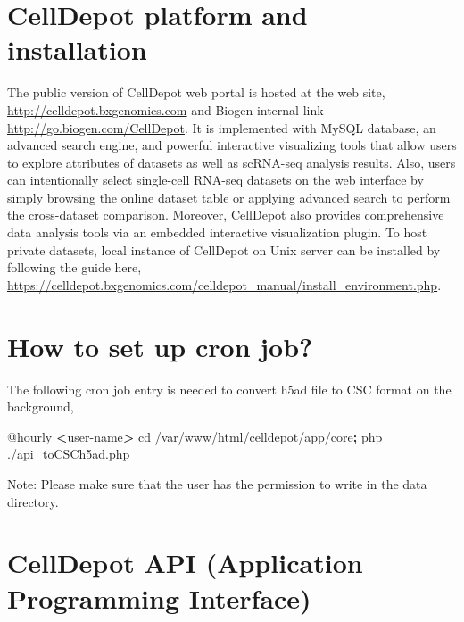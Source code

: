 \documentclass[
  openany]{book}
\newenvironment{Shaded}{\begin{snugshade}}{\end{snugshade}}
\newcommand{\ExtensionTok}[1]{#1}
\newcommand{\KeywordTok}[1]{\textcolor[rgb]{0.13,0.29,0.53}{\textbf{#1}}}
\newcommand{\NormalTok}[1]{#1}
\newcommand{\OperatorTok}[1]{\textcolor[rgb]{0.81,0.36,0.00}{\textbf{#1}}}
\begin{document}
\hypertarget{celldepot-platform-and-installation}{%
\section{CellDepot platform and installation}\label{celldepot-platform-and-installation}}

The public version of CellDepot web portal is hosted at the web site, \url{http://celldepot.bxgenomics.com} and Biogen internal link \url{http://go.biogen.com/CellDepot}. It is implemented with MySQL database, an advanced search engine, and powerful interactive visualizing tools that allow users to explore attributes of datasets as well as scRNA-seq analysis results. Also, users can intentionally select single-cell RNA-seq datasets on the web interface by simply browsing the online dataset table or applying advanced search to perform the cross-dataset comparison. Moreover, CellDepot also provides comprehensive data analysis tools via an embedded interactive visualization plugin. To host private datasets, local instance of CellDepot on Unix server can be installed by following the guide here, \url{https://celldepot.bxgenomics.com/celldepot_manual/install_environment.php}.

\hypertarget{cron}{%
\section{How to set up cron job?}\label{cron}}

The following cron job entry is needed to convert h5ad file to CSC format on the background,

\begin{Shaded}
\begin{Highlighting}[]
\ExtensionTok{@hourly} \OperatorTok{\textless{}}\NormalTok{user{-}name}\OperatorTok{\textgreater{}}\NormalTok{ cd /var/www/html/celldepot/app/core}\KeywordTok{;} \ExtensionTok{php}\NormalTok{ ./api\_toCSCh5ad.php}
\end{Highlighting}
\end{Shaded}

Note: Please make sure that the user has the permission to write in the data directory.

\hypertarget{celldepot-api-application-programming-interface}{%
\section{CellDepot API (Application Programming Interface)}\label{celldepot-api-application-programming-interface}}
\end{document}
